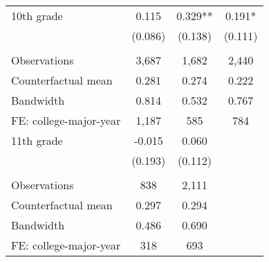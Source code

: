 {{\begin{tabular}{lccc}
10th grade          &       0.115   &       0.329** &       0.191*  \\
                    &     (0.086)   &     (0.138)   &     (0.111)   \\
                    &               &               &               \\
Observations        &       3,687   &       1,682   &       2,440   \\
Counterfactual mean &       0.281   &       0.274   &       0.222   \\
Bandwidth           &       0.814   &       0.532   &       0.767   \\
FE: college-major-year&       1,187   &         585   &         784   \\
 
11th grade          &      -0.015   &       0.060   \\
                    &     (0.193)   &     (0.112)   \\
                    &               &               \\
Observations        &         838   &       2,111   \\
Counterfactual mean &       0.297   &       0.294   \\
Bandwidth           &       0.486   &       0.690   \\
FE: college-major-year&         318   &         693   \\
 

\bottomrule
\end{tabular}
}
}

